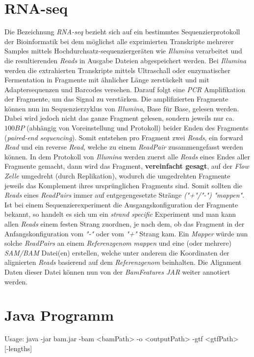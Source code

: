\documentclass[12pt]{article}
\begin{document}
\section{RNA-seq}
Die Bezeichnung \textit{RNA-seq} bezieht sich auf ein bestimmtes Sequenzierprotokoll der Bioinformatik bei dem
möglichst alle exprimierten Transkripte mehrerer Samples mittels Hochdurchsatz-sequenziergeräten wie
\textit{Illumina} verarbeitet und die resultierenden \textit{Reads} in Ausgabe Dateien abgespeichert werden.
Bei \textit{Illumina} werden die extrahierten Transkripte mittels Ultraschall oder enzymatischer Fermentation in Fragmente mit ähnlicher Länge
zerstückelt und mit Adaptersequenzen und Barcodes versehen. Darauf folgt eine \textit{PCR} Amplifikation der 
Fragmente, um das Signal zu verstärken. Die amplifizierten Fragmente können nun im Sequenzierzyklus 
von \textit{Illumina}, Base für Base, gelesen werden. Dabei wird jedoch nicht das ganze Fragment gelesen, sondern
jeweils nur ca. $100BP$ (abhängig von Voreinstellung und Protokoll) beider Enden des Fragments (\textit{paired-end sequencing}).
Somit entstehen pro Fragment zwei \textit{Reads}, ein forward \textit{Read} und ein reverse \textit{Read},
welche zu einem \textit{ReadPair} zusammengefasst werden können. 
In dem Protokoll von \textit{Illumina} werden zuerst alle \textit{Reads} eines Endes aller
Fragmente gemacht, dann wird das Fragment, \textbf{vereinfacht gesagt}, auf der \textit{Flow Zelle} umgedreht (durch Replikation), wodurch 
die umgedrehten Fragmente jeweils das Komplement ihres ursprünglichen Fragments sind.
Somit sollten die \textit{Reads} eines \textit{ReadPairs} immer auf entgegengesetzte Stränge \textit{("+"/"-")}
\textit{"mappen"}. Ist bei einem Sequenzierexperiment die Ausgangskonfiguration der Fragmente bekannt, so handelt 
es sich um ein \textit{strand specific} Experiment und man kann allen
\textit{Reads} einem festen Strang zuordnen, je nach dem, ob das Fragment in der Anfangskonfiguration
vom \textit{"-"} oder vom \textit{"+"} Strang kam.
Ein \textit{Mapper} würde nun solche \textit{ReadPairs} an einem \textit{Referenzgenom} \textit{mappen}
und eine (oder mehrere) \textit{SAM/BAM} Datei(en) erstellen, welche unter anderem die Koordinaten der alignierten 
\textit{Reads} basierend auf dem \textit{Referenzgenom} beinhalten. 
Die Alignment Daten dieser Datei können nun von der \textit{BamFeatures JAR} weiter annotiert werden. 


\section{Java Programm}
\begin{verbatim*}
Usage:
    java -jar bam.jar -bam <bamPath> -o <outputPath> -gtf <gtfPath> \\
                      [-frstrand <true/false>] [-lengths]
\end{verbatim*}
\end{document}
